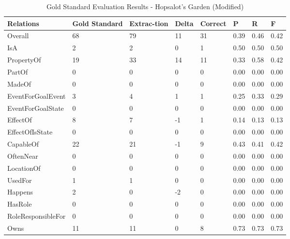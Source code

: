 \begin{table}[H]   %
\centering
\caption{Gold Standard Evaluation Results - Hopsalot's Garden (Modified)} \vspace{0.25em}
\begin{tabular}{|p{3.5cm}|p{2cm}|p{1.5cm}|p{1cm}|p{1.5cm}|p{1cm}|p{1cm}|p{1cm}|} \hline
\textbf{Relations} & \textbf{Gold Standard} & \textbf{Extrac-tion} & \textbf{Delta} & \textbf{Correct} & \textbf{P} & \textbf{R} & \textbf{F} \\ \hline
Overall & 68 & 79 & 11 & 31 & 0.39 & 0.46 & 0.42 \\ \hline
IsA & 2 & 2 & 0 & 1 & 0.50 & 0.50 & 0.50 \\ \hline
PropertyOf & 19 & 33 & 14 & 11 & 0.33 & 0.58 & 0.42 \\ \hline
PartOf  & 0 & 0 & 0 & 0 & 0.00 & 0.00 & 0.00 \\ \hline
MadeOf & 0 & 0 & 0 & 0 & 0.00 & 0.00 & 0.00 \\ \hline
EventForGoalEvent & 3 & 4 & 1 & 1 & 0.25 & 0.33 & 0.29 \\ \hline
EventForGoalState & 0 & 0 & 0 & 0 & 0.00 & 0.00 & 0.00 \\ \hline
EffectOf & 8 & 7 & -1 & 1 & 0.14 & 0.13 & 0.13 \\ \hline
EffectOfIsState & 0 & 0 & 0 & 0 & 0.00 & 0.00 & 0.00 \\ \hline
CapableOf & 22 & 21 & -1 & 9 & 0.43 & 0.41 & 0.42 \\ \hline
OftenNear & 0 & 0 & 0 & 0 & 0.00 & 0.00 & 0.00 \\ \hline
LocationOf & 0 & 0 & 0 & 0 & 0.00 & 0.00 & 0.00 \\ \hline
UsedFor & 1 & 1 & 0 & 0 & 0.00 & 0.00 & 0.00 \\ \hline
Happens & 2 & 0 & -2 & 0 & 0.00 & 0.00 & 0.00 \\ \hline
HasRole & 0 & 0 & 0 & 0 & 0.00 & 0.00 & 0.00 \\ \hline
RoleResponsibleFor & 0 & 0 & 0 & 0 & 0.00 & 0.00 & 0.00 \\ \hline
Owns & 11 & 11 & 0 & 8 & 0.73 & 0.73 & 0.73 \\ \hline
\end{tabular}
\label{tab:gold3}
\end{table}

